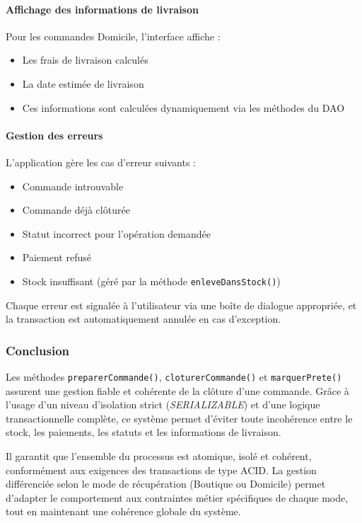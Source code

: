\paragraph{Affichage des informations de livraison}

Pour les commandes Domicile, l'interface affiche :

\begin{itemize}
    \item Les frais de livraison calculés
    \item La date estimée de livraison
    \item Ces informations sont calculées dynamiquement via les méthodes du DAO
\end{itemize}

\paragraph{Gestion des erreurs}

L'application gère les cas d'erreur suivants :

\begin{itemize}
    \item Commande introuvable
    \item Commande déjà clôturée
    \item Statut incorrect pour l'opération demandée
    \item Paiement refusé
    \item Stock insuffisant (géré par la méthode \texttt{enleveDansStock()})
\end{itemize}

Chaque erreur est signalée à l'utilisateur via une boîte de dialogue appropriée, et la transaction est automatiquement annulée en cas d'exception.

\subsubsection{Conclusion}

Les méthodes \texttt{preparerCommande()}, \texttt{cloturerCommande()} et \texttt{marquerPrete()} assurent une gestion fiable et cohérente de la clôture d'une commande. Grâce à l'usage d'un niveau d'isolation strict (\textit{SERIALIZABLE}) et d'une logique transactionnelle complète, ce système permet d'éviter toute incohérence entre le stock, les paiements, les statuts et les informations de livraison.

Il garantit que l'ensemble du processus est atomique, isolé et cohérent, conformément aux exigences des transactions de type ACID. La gestion différenciée selon le mode de récupération (Boutique ou Domicile) permet d'adapter le comportement aux contraintes métier spécifiques de chaque mode, tout en maintenant une cohérence globale du système.

